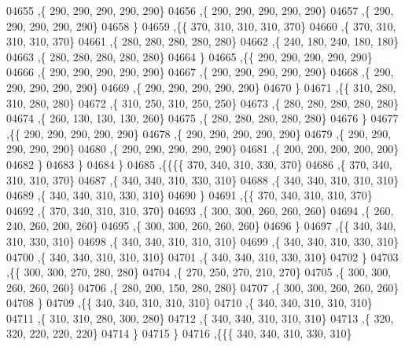 \begin{DoxyCode}
04655     ,\{   290,   290,   290,   290,   290\}
04656     ,\{   290,   290,   290,   290,   290\}
04657     ,\{   290,   290,   290,   290,   290\}
04658     \}
04659    ,\{\{   370,   310,   310,   310,   370\}
04660     ,\{   370,   310,   310,   310,   370\}
04661     ,\{   280,   280,   280,   280,   280\}
04662     ,\{   240,   180,   240,   180,   180\}
04663     ,\{   280,   280,   280,   280,   280\}
04664     \}
04665    ,\{\{   290,   290,   290,   290,   290\}
04666     ,\{   290,   290,   290,   290,   290\}
04667     ,\{   290,   290,   290,   290,   290\}
04668     ,\{   290,   290,   290,   290,   290\}
04669     ,\{   290,   290,   290,   290,   290\}
04670     \}
04671    ,\{\{   310,   280,   310,   280,   280\}
04672     ,\{   310,   250,   310,   250,   250\}
04673     ,\{   280,   280,   280,   280,   280\}
04674     ,\{   260,   130,   130,   130,   260\}
04675     ,\{   280,   280,   280,   280,   280\}
04676     \}
04677    ,\{\{   290,   290,   290,   290,   290\}
04678     ,\{   290,   290,   290,   290,   290\}
04679     ,\{   290,   290,   290,   290,   290\}
04680     ,\{   290,   290,   290,   290,   290\}
04681     ,\{   200,   200,   200,   200,   200\}
04682     \}
04683    \}
04684   \}
04685  ,\{\{\{\{   370,   340,   310,   330,   370\}
04686     ,\{   370,   340,   310,   310,   370\}
04687     ,\{   340,   340,   310,   330,   310\}
04688     ,\{   340,   340,   310,   310,   310\}
04689     ,\{   340,   340,   310,   330,   310\}
04690     \}
04691    ,\{\{   370,   340,   310,   310,   370\}
04692     ,\{   370,   340,   310,   310,   370\}
04693     ,\{   300,   300,   260,   260,   260\}
04694     ,\{   260,   240,   260,   200,   260\}
04695     ,\{   300,   300,   260,   260,   260\}
04696     \}
04697    ,\{\{   340,   340,   310,   330,   310\}
04698     ,\{   340,   340,   310,   310,   310\}
04699     ,\{   340,   340,   310,   330,   310\}
04700     ,\{   340,   340,   310,   310,   310\}
04701     ,\{   340,   340,   310,   330,   310\}
04702     \}
04703    ,\{\{   300,   300,   270,   280,   280\}
04704     ,\{   270,   250,   270,   210,   270\}
04705     ,\{   300,   300,   260,   260,   260\}
04706     ,\{   280,   200,   150,   280,   280\}
04707     ,\{   300,   300,   260,   260,   260\}
04708     \}
04709    ,\{\{   340,   340,   310,   310,   310\}
04710     ,\{   340,   340,   310,   310,   310\}
04711     ,\{   310,   310,   280,   300,   280\}
04712     ,\{   340,   340,   310,   310,   310\}
04713     ,\{   320,   320,   220,   220,   220\}
04714     \}
04715    \}
04716   ,\{\{\{   340,   340,   310,   330,   310\}

\end{DoxyCode}
